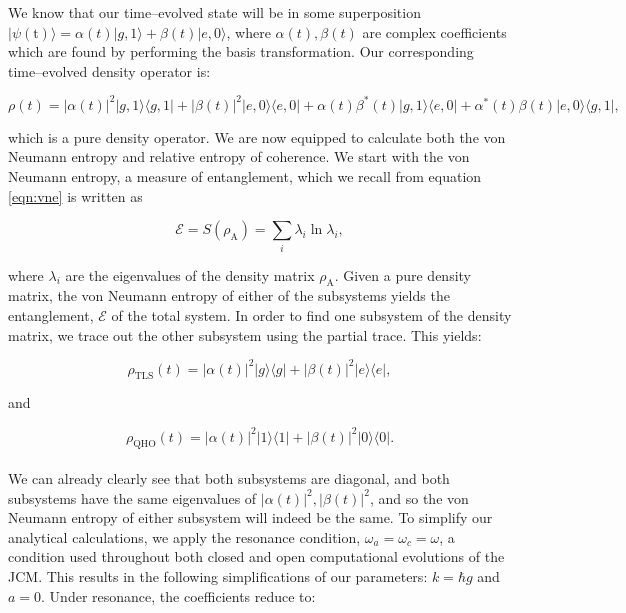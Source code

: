 \documentclass[11pt]{article}
\begin{document}
We know that our time--evolved state will be in some superposition $|\psi(\text{t})\rangle = \alpha(t)|g,1\rangle + \beta(t)|e,0\rangle$, where $\alpha(t),\beta(t)$ are complex coefficients which are found by performing the basis transformation. Our corresponding time--evolved density operator is:

\begin{equation} \label{eqn:JCM_dm(t)_closed}
    \rho(t) = |\alpha(t)|^2|g,1\rangle\langle g,1| + |\beta(t)|^2 |e,0\rangle\langle e,0| + \alpha(t)\beta^*(t)|g,1\rangle\langle e,0| + \alpha^*(t)\beta(t)|e,0\rangle\langle g,1|,
\end{equation}

which is a pure density operator. We are now equipped to calculate both the von Neumann entropy and relative entropy of coherence. We start with the von Neumann entropy, a measure of entanglement, which we recall from equation \eqref{eqn:vne} is written as 

\begin{equation*}
   \mathcal{E} = S(\rho_{\scriptscriptstyle \text{A}}) = \sum_i \lambda_i\ln\lambda_i,
\end{equation*}

where $\lambda_i$ are the eigenvalues of the density matrix $\rho_{\scriptscriptstyle \text{A}}$. Given a pure density matrix, the von Neumann entropy of either of the subsystems yields the entanglement, $\mathcal{E}$ of the total system. In order to find one subsystem of the density matrix, we trace out the other subsystem using the partial trace. This yields:

\begin{equation*}
        \rho_{\scriptscriptstyle \text{TLS}}(t) = |\alpha(t)|^2|g\rangle\langle g| + |\beta(t)|^2 |e\rangle\langle e|,
\end{equation*}

and

\begin{equation} \label{eqn:subsys_JCM_closed}
        \rho_{\scriptscriptstyle \text{QHO}}(t) = |\alpha(t)|^2|1\rangle\langle 1| + |\beta(t)|^2 |0\rangle\langle 0|.
\end{equation}
\\
We can already clearly see that both subsystems are diagonal, and both subsystems have the same eigenvalues of $|\alpha(t)|^2,|\beta(t)|^2$, and so the von Neumann entropy of either subsystem will indeed be the same. To simplify our analytical calculations, we apply the resonance condition, $\omega_a = \omega_c = \omega$, a condition used throughout both closed and open computational evolutions of the JCM. This results in the following simplifications of our parameters: $k = \hbar g$ and $a = 0$. Under resonance, the coefficients reduce to:
\end{document}

